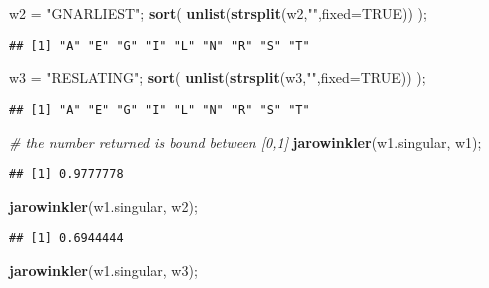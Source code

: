 \documentclass[
]{article}
\newenvironment{Shaded}{\begin{snugshade}}{\end{snugshade}}
\newcommand{\CommentTok}[1]{\textcolor[rgb]{0.56,0.35,0.01}{\textit{#1}}}
\newcommand{\DataTypeTok}[1]{\textcolor[rgb]{0.13,0.29,0.53}{#1}}
\newcommand{\KeywordTok}[1]{\textcolor[rgb]{0.13,0.29,0.53}{\textbf{#1}}}
\newcommand{\NormalTok}[1]{#1}
\newcommand{\OtherTok}[1]{\textcolor[rgb]{0.56,0.35,0.01}{#1}}
\newcommand{\StringTok}[1]{\textcolor[rgb]{0.31,0.60,0.02}{#1}}
\begin{document}
\begin{Shaded}
\begin{Highlighting}[]
\NormalTok{w2 =}\StringTok{ "GNARLIEST"}\NormalTok{;             }\KeywordTok{sort}\NormalTok{( }\KeywordTok{unlist}\NormalTok{(}\KeywordTok{strsplit}\NormalTok{(w2,}\StringTok{""}\NormalTok{,}\DataTypeTok{fixed=}\OtherTok{TRUE}\NormalTok{)) );}
\end{Highlighting}
\end{Shaded}

\begin{verbatim}
## [1] "A" "E" "G" "I" "L" "N" "R" "S" "T"
\end{verbatim}

\begin{Shaded}
\begin{Highlighting}[]
\NormalTok{w3 =}\StringTok{ "RESLATING"}\NormalTok{;             }\KeywordTok{sort}\NormalTok{( }\KeywordTok{unlist}\NormalTok{(}\KeywordTok{strsplit}\NormalTok{(w3,}\StringTok{""}\NormalTok{,}\DataTypeTok{fixed=}\OtherTok{TRUE}\NormalTok{)) );}
\end{Highlighting}
\end{Shaded}

\begin{verbatim}
## [1] "A" "E" "G" "I" "L" "N" "R" "S" "T"
\end{verbatim}

\begin{Shaded}
\begin{Highlighting}[]
\CommentTok{\# the number returned is bound between [0,1]}
\KeywordTok{jarowinkler}\NormalTok{(w1.singular, w1);}
\end{Highlighting}
\end{Shaded}

\begin{verbatim}
## [1] 0.9777778
\end{verbatim}

\begin{Shaded}
\begin{Highlighting}[]
\KeywordTok{jarowinkler}\NormalTok{(w1.singular, w2);}
\end{Highlighting}
\end{Shaded}

\begin{verbatim}
## [1] 0.6944444
\end{verbatim}

\begin{Shaded}
\begin{Highlighting}[]
\KeywordTok{jarowinkler}\NormalTok{(w1.singular, w3);}
\end{Highlighting}
\end{Shaded}
\end{document}
